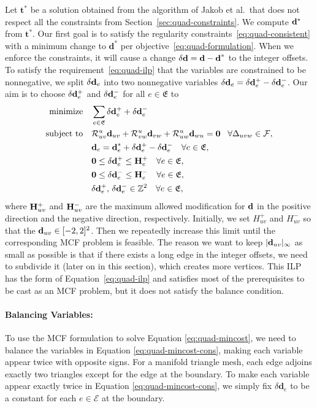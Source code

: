 Let ${\textbf{t}}^*$ be a solution obtained from the algorithm of Jakob et al.\ that does not respect all the constraints from Section~\ref{sec:quad-constraints}. We compute ${\mathbf{d}}^*$ from ${\textbf{t}}^*$. Our first goal is to satisfy the regularity constraints~\eqref{eq:quad-consistent} with a minimum change to ${\textbf{d}}^*$ per objective~\eqref{eq:quad-formulation}. When we enforce the constraints, it will cause a change $\delta \mathbf{d}={\textbf{d}}-{\textbf{d}}^*$ to the integer offsets. To satisfy the requirement~\eqref{eq:quad-ilp} that the variables are constrained to be nonnegative, we split $\delta \mathbf{d}_e$ into two nonnegative variables $\delta \mathbf{d}_e = \delta \mathbf{d}^+_e - \delta \mathbf{d}^-_e$.  Our aim is to choose $\delta \mathbf{d}^+_e$ and $\delta \mathbf{d}^-_e$ for all $e \in \mathfrak{E}$ to
\begin{align}
\operatorname*{minimize} \quad & \sum_{e \in \mathfrak{E}} \delta\mathbf{d}^+_e+\delta\mathbf{d}^-_e\label{eq:quad-mincost}\\
\text{subject to} \quad & \mathcal{R}^u_{uv}{\textbf{d}}_{uv}+\mathcal{R}^u_{vw}{\textbf{d}}_{vw}+\mathcal{R}^u_{uw}{\textbf{d}}_{wu}=\textbf{0} \;\;\;\forall \Delta_{uvw} \in \mathcal{F}, \label{eq:quad-mincost-cons} \\
& {\mathbf{d}}_e = {\textbf{d}}^*_e +\delta \mathbf{d}^+_e - \delta \mathbf{d}^-_e \quad\forall e \in \mathfrak{E}, \notag \\
& \mathbf{0} \le \delta \mathbf{d}^+_{e} \le \mathbf{H}_{e}^+  \quad \forall e \in \mathfrak{E}, \notag \\
& \mathbf{0} \le \delta \mathbf{d}^-_{e} \le \mathbf{H}_{e}^-  \quad \forall e \in \mathfrak{E}, \notag \\
&       \delta \mathbf{d}^+_e, \, \delta \mathbf{d}^-_e \in \mathbb{Z}^2 \quad \forall e \in \mathfrak{E}, \notag
\end{align}
where $\mathbf{H}_{uv}^+$ and $\mathbf{H}_{uv}^-$ are the maximum allowed modification for ${\mathbf{d}}$ in the positive direction and the negative direction, respectively.  Initially, we set $H^+_{uv}$ and $H^-_{uv}$ so that the $\mathbf{d}_{uv} \in [-2,2]^2$. Then we repeatedly increase this limit until the corresponding MCF problem is feasible. The reason we want to keep $|\mathbf{d}_{uv}|_\infty$ as small as possible is that if there exists a long edge in the integer offsets, we need to subdivide it (later on in this section), which creates more vertices.  This ILP has the form of Equation~\eqref{eq:quad-ilp} and satisfies most of the prerequisites to be cast as an MCF problem, but it does not satisfy the balance condition.

\paragraph*{Balancing Variables:}
To use the MCF formulation to solve Equation \eqref{eq:quad-mincost}, we need to balance the variables in Equation \eqref{eq:quad-mincost-cons},  making each variable appear twice with opposite signs.  For a manifold triangle mesh, each edge adjoins exactly two triangles except for the edge at the boundary. To make each variable appear exactly twice in Equation \eqref{eq:quad-mincost-cons}, we simply fix $\delta{\textbf{d}}_{e}$ to be a constant for each $e \in \mathcal{E}$ at the boundary.

